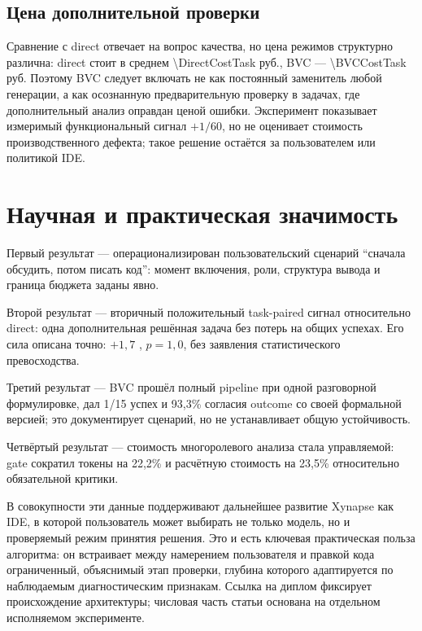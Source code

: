 \documentclass[11pt]{article}
\begin{document}
\subsection{Цена дополнительной проверки}

Сравнение с direct отвечает на вопрос качества, но цена режимов структурно
различна: direct стоит в среднем \num{\DirectCostTask} руб., BVC ---
\num{\BVCCostTask} руб. Поэтому BVC следует включать не как постоянный
заменитель любой генерации, а как осознанную предварительную проверку в
задачах, где дополнительный анализ оправдан ценой ошибки. Эксперимент
показывает измеримый функциональный сигнал \(+1/60\), но не оценивает
стоимость производственного дефекта; такое решение остаётся за пользователем
или политикой IDE.

\section{Научная и практическая значимость}

Первый результат --- операционализирован пользовательский сценарий
\enquote{сначала обсудить, потом писать код}: момент включения, роли,
структура вывода и граница бюджета заданы явно.

Второй результат --- вторичный положительный task-paired сигнал относительно direct:
одна дополнительная решённая задача без потерь на общих успехах. Его сила
описана точно: \(+1{,}7\) \pp, \(p=1{,}0\), без заявления статистического
превосходства.

Третий результат --- BVC прошёл полный pipeline при одной разговорной
формулировке, дал 1/15 успех и 93,3\% согласия outcome со своей формальной
версией; это документирует сценарий, но не устанавливает общую устойчивость.

Четвёртый результат --- стоимость многоролевого анализа стала управляемой:
gate сократил токены на 22,2\% и расчётную стоимость на 23,5\% относительно
обязательной критики.

В совокупности эти данные поддерживают дальнейшее развитие Xynapse как IDE,
в которой пользователь может выбирать не только модель, но и проверяемый
режим принятия решения. Это и есть ключевая практическая польза алгоритма:
он встраивает между намерением пользователя и правкой кода ограниченный,
объяснимый этап проверки, глубина которого адаптируется по наблюдаемым
диагностическим признакам. Ссылка на диплом \cite{khalilov2026} фиксирует
происхождение архитектуры; числовая часть статьи основана на отдельном
исполняемом эксперименте.
\end{document}
